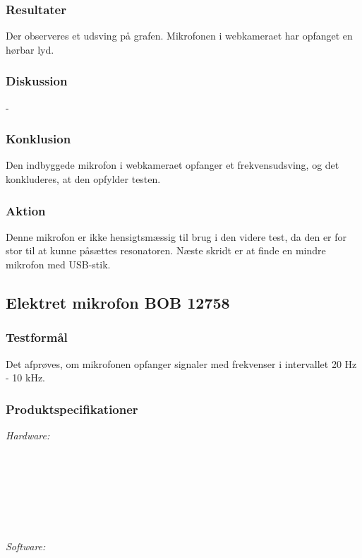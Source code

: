 		\subsubsection{Resultater}
		Der observeres et udsving på grafen. Mikrofonen i webkameraet har opfanget en hørbar lyd.  
		
		\subsubsection{Diskussion} 
		-
		\subsubsection{Konklusion}
		Den indbyggede mikrofon i webkameraet opfanger et frekvensudsving, og det konkluderes, at den opfylder testen. 
		
		\subsubsection{Aktion}
		Denne mikrofon er ikke hensigtsmæssig til brug i den videre test, da den er for stor til at kunne påsættes resonatoren. Næste skridt er at finde en mindre mikrofon med USB-stik. 
		
\subsection{Elektret mikrofon BOB 12758}
		\subsubsection{Testformål}
		Det afprøves, om mikrofonen opfanger signaler med frekvenser i intervallet 20 Hz - 10 kHz.
		
		\subsubsection{Produktspecifikationer}
	
			\textit{Hardware:}\\
			\elektret\\
			\pinstre\\
			\mikrofonkabel\\
			\krympeflex\\
			\daq\\
			\daqusb\\			
			\PC\\
		
	
			\textit{Software:}\\
			\labview\\
			\daqsoft\\
			\onlineg\\
	
